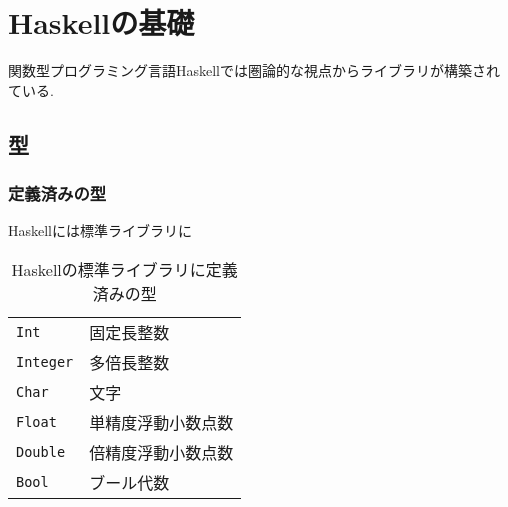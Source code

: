 \documentclass[dvipdfmx]{jsbook}
\theoremstyle{plain}
\newtheorem{Def}[thm]{定義}
\begin{document}
\begin{comment}
\section{環}
\begin{Def}
可換群$(G,+)$が次を満たすとき, {\bf $(G,+)$は加法群である}といい, {\bf $+$を加法}という.
\end{Def}
\begin{Def}
{\bf \times を乗法}という.
\end{Def}
\begin{Def}
{\bf 分配 distributive property}
\end{Def}


\section{体}
\begin{Def}
以下の条件を満たす集合を{\bf 体}という.
\begin{enumerate}
\item
加法について可換群になっている．すなわち,加法について閉じていて，単位元と逆元が存在する．
\item 
乗法について可換群になっている. すなわち,乗法について閉じていて，単位元と逆元が存在する.
\item 
加法と乗法について分配法則が成り立つ.
\end{enumerate}
\end{Def}
体ではいわゆる四則演算が可能である
\end{comment}

\chapter{Haskellの基礎}
関数型プログラミング言語Haskellでは圏論的な視点からライブラリが構築されている.
\section{型}
\subsection{定義済みの型}
Haskellには標準ライブラリに
\begin{table}[h]
\caption{Haskellの標準ライブラリに定義済みの型}
\begin{center}
\begin{tabular}{ll}
\verb|Int|&固定長整数\\
\verb|Integer|&多倍長整数 \\
\verb|Char|&文字\\
\verb|Float|&単精度浮動小数点数\\
\verb|Double|&倍精度浮動小数点数\\
\verb|Bool|&ブール代数\\
\end{tabular}
\end{center}
\end{table}
\end{document}
